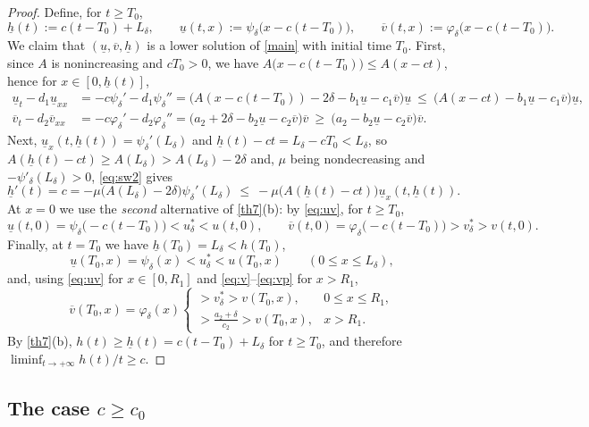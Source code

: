 \documentclass[reqno]{amsart}
\theoremstyle{plain}
\theoremstyle{definition}
\theoremstyle{remark}
\begin{document}
\begin{proof}
	Define, for $t\ge T_0$,
	\[
	\underline{h}(t) := c(t-T_0) + L_\delta,\qquad
	\underline{u}(t,x) := \psi_{\delta}\big(x - c(t-T_0)\big),\qquad
	\overline{v}(t,x) := \varphi_{\delta}\big(x - c(t-T_0)\big).
	\]
	We claim that $(\underline u,\overline v,\underline h)$ is a lower solution of
	\eqref{main} with initial time $T_0$. First, since $A$ is nonincreasing and
	$cT_0>0$, we have $A\big(x-c(t-T_0)\big)\le A(x-ct)$, hence for
	$x\in[0,\underline h(t)]$,
	\begin{align*}
		\underline{u}_t - d_1 \underline{u}_{xx}
		&= -c \psi_{\delta}' - d_1 \psi_{\delta}''
		= \big(A(x -c(t-T_0)) -2 \delta - b_1 \underline{u} - c_1 \overline{v}\big) \underline{u}
		\ \le\ \big(A(x - ct) - b_1 \underline{u} - c_1 \overline{v}\big) \underline{u},\\
		\overline{v}_t - d_2 \overline{v}_{xx}
		&= -c\varphi_{\delta}' -d_2 \varphi_{\delta}''
		= \big(a_2 + 2\delta - b_2 \underline u - c_2 \overline v\big) \overline v
		\ \ge\ \big(a_2 - b_2\underline{u} - c_2 \overline{v}\big) \overline{v}.
	\end{align*}
	Next, $\underline u_x(t,\underline h(t))=\psi_\delta'(L_\delta)$ and
	$\underline h(t)-ct=L_\delta-cT_0<L_\delta$, so
	$A(\underline h(t)-ct)\ge A(L_\delta)>A(L_\delta)-2\delta$ and, $\mu$ being
	nondecreasing and $-\psi'_\delta(L_\delta)>0$, \eqref{eq:sw2} gives
	\[
	\underline{h}'(t) = c = -\mu\big(A(L_\delta) - 2 \delta \big)\psi_{\delta}'(L_\delta)
	\ \le\ -\mu\big(A(\underline{h}(t) - ct)\big)\underline{u}_x(t,\underline{h}(t)).
	\]
	At $x=0$ we use the \emph{second} alternative of \cref{th7}(b): by
	\eqref{eq:uv}, for $t\ge T_0$,
	\[
	\underline{u}(t,0)=\psi_\delta\big(-c(t-T_0)\big)<u^*_\delta<u(t,0),
	\qquad
	\overline{v}(t,0)=\varphi_\delta\big(-c(t-T_0)\big)>v^*_\delta>v(t,0).
	\]
	Finally, at $t=T_0$ we have $\underline h(T_0)=L_\delta<h(T_0)$,
	\[
	\underline{u}(T_0,x) = \psi_{\delta}(x) < u^*_\delta < u(T_0,x)
	\qquad (0\le x \le L_\delta),
	\]
	and, using \eqref{eq:uv} for $x\in[0,R_1]$ and \eqref{eq:v}--\eqref{eq:vp} for
	$x>R_1$,
	\[
	\overline{v}(T_0,x) = \varphi_{\delta}(x)
	\begin{cases}
		>v^*_\delta> v(T_0,x), & 0\le x\le R_1,\\[2pt]
		>\frac{a_2+\delta}{c_2}>v(T_0,x), & x> R_1 .
	\end{cases}
	\]
	By \cref{th7}(b), $h(t)\ge\underline h(t)=c(t-T_0)+L_\delta$ for $t\ge T_0$,
	and therefore $\liminf_{t\to+\infty}h(t)/t\ge c$.
\end{proof}

\subsection{The case \texorpdfstring{$c\ge c_0$}{c>=c0}}
\end{document}
